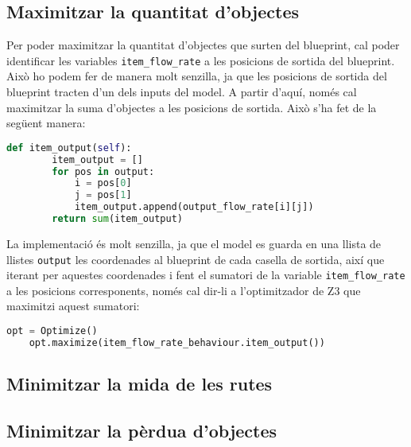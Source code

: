 \subsection{Maximitzar la quantitat d'objectes}
Per poder maximitzar la quantitat d'objectes que surten del blueprint, cal poder identificar les variables \texttt{item\_flow\_rate} a les posicions de sortida del blueprint. Això ho podem fer de manera molt senzilla, ja que les posicions de sortida del blueprint tracten d'un dels inputs del model. A partir d'aquí, només cal maximitzar la suma d'objectes a les posicions de sortida. Això s'ha fet de la següent manera:
\begin{lstlisting}[language=Python, caption=Quantitat d'objectes de sortida]
    def item_output(self):
        item_output = []
        for pos in output:
            i = pos[0]
            j = pos[1]
            item_output.append(output_flow_rate[i][j])
        return sum(item_output)
\end{lstlisting}

La implementació és molt senzilla, ja que el model es guarda en una llista de llistes \texttt{output} les coordenades al blueprint de cada casella de sortida, així que iterant per aquestes coordenades i fent el sumatori de la variable \texttt{item\_flow\_rate} a les posicions corresponents, només cal dir-li a l'optimitzador de Z3 que maximitzi aquest sumatori:

\begin{lstlisting}[language=Python, caption=Maximitzar el criteri]
    opt = Optimize()
    opt.maximize(item_flow_rate_behaviour.item_output())
\end{lstlisting}

\subsection{Minimitzar la mida de les rutes}
\subsection{Minimitzar la pèrdua d'objectes}





